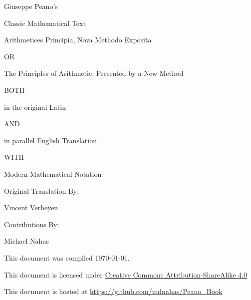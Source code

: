 \documentclass{book}
\begin{document}
 




%
{ \centering

  \vspace*{1cm}
  
  {\Large Giuseppe Peano's}

  {\normalsize Classic Mathematical Text}

  \vspace{1cm}

  {\Huge Arithmetices Principia, Nova Methodo Exposita}

  \vspace{0.5cm}

  {\Large OR}

  \vspace{0.5cm}

  {\Huge The Principles of Arithmetic, Presented by a New Method}

  \vspace{1cm}

  BOTH %

  {\Large in the original Latin}

  AND

  {\Large in parallel English Translation}

  WITH

  {\Large Modern Mathematical Notation}
  
  \vspace{1cm}

  Original Translation By:

  {\Large Vincent Verheyen}

  \vspace{1cm}

  Contributions By:

  Michael Nahas

  \vfill

  
  \normalsize This document was compiled \today.

  \normalsize This document is licensed under \href{http://creativecommons.org/licenses/by-sa/4.0/}{Creative Commons Attribution-ShareAlike 4.0}

  \normalsize This document is hosted at \url{https://github.com/mdnahas/Peano_Book}

} %
\newpage  
\end{document}
